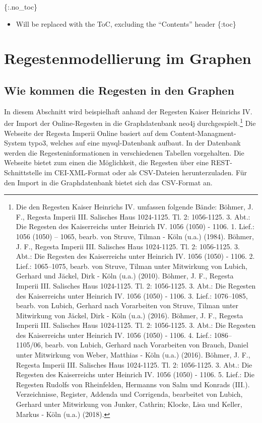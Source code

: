 \documentclass[ngerman,]{scrreprt}
\providecommand{\tightlist}{%
  \setlength{\itemsep}{0pt}\setlength{\parskip}{0pt}}
\begin{document}
\{:.no\_toc\}

\begin{itemize}
\tightlist
\item
  Will be replaced with the ToC, excluding the ``Contents'' header \{:toc\}
\end{itemize}

\hypertarget{regestenmodellierung-im-graphen}{%
\chapter{Regestenmodellierung im Graphen}\label{regestenmodellierung-im-graphen}}

\hypertarget{wie-kommen-die-regesten-in-den-graphen}{%
\section{Wie kommen die Regesten in den Graphen}\label{wie-kommen-die-regesten-in-den-graphen}}

In diesem Abschnitt wird beispielhaft anhand der Regesten Kaiser Heinrichs IV. der Import der Online-Regesten in die Graphdatenbank neo4j durchgespielt.\footnote{Die den Regesten Kaiser Heinrichs IV. umfassen folgende Bände: Böhmer, J. F., Regesta Imperii III. Salisches Haus 1024-1125. Tl. 2: 1056-1125. 3. Abt.: Die Regesten des Kaiserreichs unter Heinrich IV. 1056 (1050) - 1106. 1. Lief.: 1056 (1050) -- 1065, bearb. von Struve, Tilman - Köln (u.a.) (1984). Böhmer, J. F., Regesta Imperii III. Salisches Haus 1024-1125. Tl. 2: 1056-1125. 3. Abt.: Die Regesten des Kaiserreichs unter Heinrich IV. 1056 (1050) - 1106. 2. Lief.: 1065--1075, bearb. von Struve, Tilman unter Mitwirkung von Lubich, Gerhard und Jäckel, Dirk - Köln (u.a.) (2010). Böhmer, J. F., Regesta Imperii III. Salisches Haus 1024-1125. Tl. 2: 1056-1125. 3. Abt.: Die Regesten des Kaiserreichs unter Heinrich IV. 1056 (1050) - 1106. 3. Lief.: 1076--1085, bearb. von Lubich, Gerhard nach Vorarbeiten von Struve, Tilman unter Mitwirkung von Jäckel, Dirk - Köln (u.a.) (2016). Böhmer, J. F., Regesta Imperii III. Salisches Haus 1024-1125. Tl. 2: 1056-1125. 3. Abt.: Die Regesten des Kaiserreichs unter Heinrich IV. 1056 (1050) - 1106. 4. Lief.: 1086--1105/06, bearb. von Lubich, Gerhard nach Vorarbeiten von Brauch, Daniel unter Mitwirkung von Weber, Matthias - Köln (u.a.) (2016). Böhmer, J. F., Regesta Imperii III. Salisches Haus 1024-1125. Tl. 2: 1056-1125. 3. Abt.: Die Regesten des Kaiserreichs unter Heinrich IV. 1056 (1050) - 1106. 5. Lief.: Die Regesten Rudolfs von Rheinfelden, Hermanns von Salm und Konrads (III.). Verzeichnisse, Register, Addenda und Corrigenda, bearbeitet von Lubich, Gerhard unter Mitwirkung von Junker, Cathrin; Klocke, Lisa und Keller, Markus - Köln (u.a.) (2018).} Die Webseite der Regesta Imperii Online basiert auf dem Content-Managment-System typo3, welches auf eine mysql-Datenbank aufbaut. In der Datenbank werden die Regesteninformationen in verschiedenen Tabellen vorgehalten. Die Webseite bietet zum einen die Möglichkeit, die Regesten über eine REST-Schnittstelle im CEI-XML-Format oder als CSV-Dateien herunterzuladen. Für den Import in die Graphdatenbank bietet sich das CSV-Format an.
\end{document}
